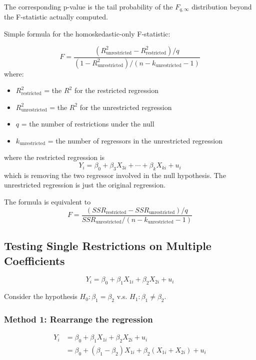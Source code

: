 \documentclass{article}
\begin{document}
The corresponding p-value is the tail probability of the $F_{q, \infty}$ distribution
beyond the F-statistic actually computed.

Simple formula for the homoskedastic-only F-statistic:

\[
	F = \dfrac{
		\left( R^2_{\text{unrestricted}} - R^2 _ {\text{restricted}} \right) / q
	}{
		\left( 1- R^2_{\text{unrestricted}} \right) / (n - k_{\text{unrestricted}} - 1)
	}
\]
where:
\begin{itemize}
	\item $R^2_{\text{restricted}}$ = the $R^2$ for the restricted regression
	\item $R^2_{\text{unrestricted}}$ = the $R^2$ for the unrestricted regression
	\item $q$ = the number of restrictions under the null
	\item $k_{\text{unrestricted}}$ = the number of regressors in the unrestricted regression
\end{itemize}

where the restricted regression is
\[
	Y_i = \beta_0 + \beta_3X_{3i} + \cdots + \beta_kX_{ki} + u_{i}
\]
which is removing the two regressor involved in the null hypothesis.
The unrestricted regression is just the original regression.

The formula is equivalent to
\[
	F = \dfrac{
		\left( SSR _{\text{restricted}} - SSR _{\text{unrestricted}}\right) / q
	}{
		SSR_{\text{unrestricted}} / (n - k_{\text{unrestricted}} - 1)
	}
\]

\subsection{Testing Single Restrictions on Multiple Coefficients}

\[
	Y_i = \beta_0 + \beta_1X_{1i} + \beta_2X_{2i} + u_{i}
\]

Consider the hypothesis $H_0: \beta_1 = \beta_2$ v.s. $H_1: \beta_1 \neq \beta_2$.

\subsubsection{Method 1: Rearrange the regression}


\[
	\begin{aligned}
		Y_i & = \beta_0 + \beta_1X_{1i} + \beta_2X_{2i} + u_{i}                       \\
		    & = \beta_0 + (\beta_1 - \beta_2) X_{1i} + \beta_2(X_{1i} + X_{2i}) + u_i
	\end{aligned}
\]
\end{document}
